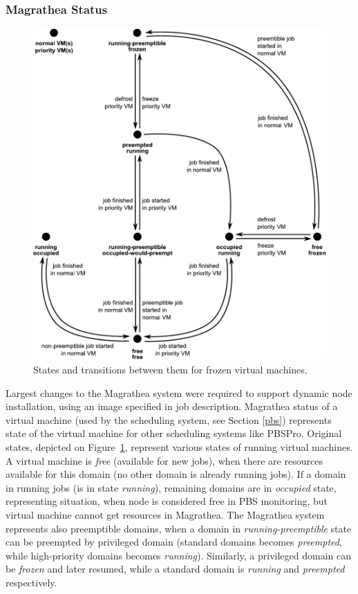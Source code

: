 \documentclass[a4paper]{article}
\begin{document}
\subsubsection{Magrathea Status}
\begin{figure}[ht]
\begin{center}
    \includegraphics[width=\columnwidth]{frozen}
    \caption{States and transitions between them for frozen
        virtual machines.}
    \label{fig:frozen}
\end{center}
\end{figure}

Largest changes to the Magrathea system were required to support dynamic node installation, using an image specified in 
job description.  Magrathea status of a virtual machine (used by the scheduling system, see Section \ref{pbs}) represents
state of the virtual machine for other scheduling systems like PBSPro.
Original states, depicted on 
Figure~\ref{fig:frozen},
represent various states of running virtual machines. A virtual machine is \textit{free} (available for new jobs), when 
there are resources available for this domain (no other domain is already running jobs). 
If a domain in running jobs (is in state \textit{running}), 
remaining domains are in \textit{occupied} state, representing situation,
when node is considered free in PBS monitoring, but 
virtual machine cannot get resources in Magrathea. The Magrathea system
represents also preemptible domains, when a domain 
in \textit{running-preemptible} state can be preempted by privileged domain (standard domains becomes \textit{preempted}, 
while high-priority domains becomes \textit{running}). Similarly, a privileged domain can be \textit{frozen}
and later resumed, while a standard domain is \textit{running} and \textit{preempted} respectively.
\end{document}
